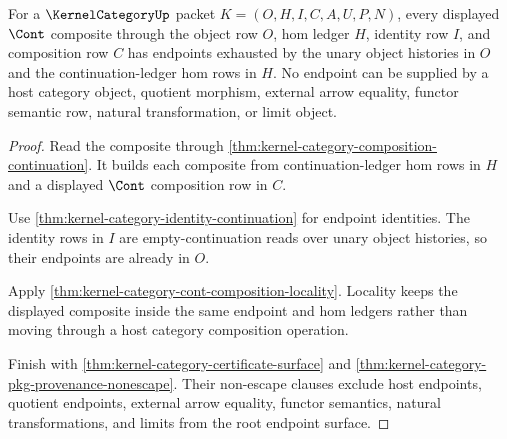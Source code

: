 \begin{theorem}
\label{thm:kernel-category-root-endpoint-exhaustion}
For a $\KernelCategoryUp$ packet $K=(O,H,I,C,A,U,P,N)$, every displayed $\Cont$ composite through the object row $O$, hom ledger $H$, identity row $I$, and composition row $C$ has endpoints exhausted by the unary object histories in $O$ and the continuation-ledger hom rows in $H$. No endpoint can be supplied by a host category object, quotient morphism, external arrow equality, functor semantic row, natural transformation, or limit object.
\end{theorem}
\begin{proof}
Read the composite through \autoref{thm:kernel-category-composition-continuation}. It builds each composite from continuation-ledger hom rows in $H$ and a displayed $\Cont$ composition row in $C$.

Use \autoref{thm:kernel-category-identity-continuation} for endpoint identities. The identity rows in $I$ are empty-continuation reads over unary object histories, so their endpoints are already in $O$.

Apply \autoref{thm:kernel-category-cont-composition-locality}. Locality keeps the displayed composite inside the same endpoint and hom ledgers rather than moving through a host category composition operation.

Finish with \autoref{thm:kernel-category-certificate-surface} and \autoref{thm:kernel-category-pkg-provenance-nonescape}. Their non-escape clauses exclude host endpoints, quotient endpoints, external arrow equality, functor semantics, natural transformations, and limits from the root endpoint surface.
\end{proof}


